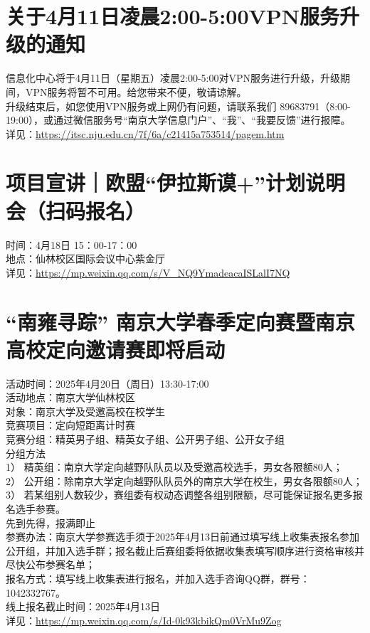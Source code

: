 \documentclass[letterpaper, 12pt]{article}
\begin{document}
\begin{multicols}{2}
\section{关于4月11日凌晨2:00-5:00VPN服务升级的通知}
信息化中心将于4月11日（星期五）凌晨2:00-5:00对VPN服务进行升级，升级期间，VPN服务将暂不可用。给您带来不便，敬请谅解。
\\升级结束后，如您使用VPN服务或上网仍有问题，请联系我们 89683791（8:00-19:00），或通过微信服务号“南京大学信息门户”、“我”、“我要反馈”进行报障。
\\详见：\url{https://itsc.nju.edu.cn/7f/6a/c21415a753514/pagem.htm}

\section{项目宣讲｜欧盟“伊拉斯谟+”计划说明会（扫码报名）}
时间：4月18日 15：00-17：00
\\地点：仙林校区国际会议中心紫金厅
\\详见：\url{https://mp.weixin.qq.com/s/V_NQ9YmadeacaISLalI7NQ}

\section{“南雍寻踪” 南京大学春季定向赛暨南京高校定向邀请赛即将启动}
活动时间：2025年4月20日（周日）13:30-17:00
\\活动地点：南京大学仙林校区
\\对象：南京大学及受邀高校在校学生
\\竞赛项目：定向短距离计时赛
\\竞赛分组：精英男子组、精英女子组、公开男子组、公开女子组
\\分组方法
\\1） 精英组：南京大学定向越野队队员以及受邀高校选手，男女各限额80人；
\\2） 公开组：除南京大学定向越野队队员外的南京大学在校生，男女各限额80人；
\\3） 若某组别人数较少，赛组委有权动态调整各组别限额，尽可能保证报名更多报名选手参赛。
\\先到先得，报满即止
\\参赛办法：南京大学参赛选手须于2025年4月13日前通过填写线上收集表报名参加公开组，并加入选手群；报名截止后赛组委将依据收集表填写顺序进行资格审核并尽快公布参赛名单；
\\报名方式：填写线上收集表进行报名，并加入选手咨询QQ群，群号：1042332767。
\\线上报名截止时间：2025年4月13日
\\详见：\url{https://mp.weixin.qq.com/s/Id-0k93kbikQm0VrMu9Zog}

\end{multicols}
\end{document}
